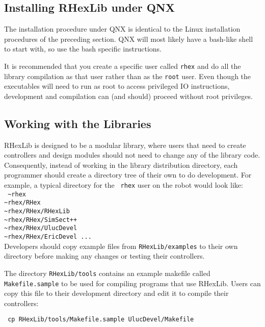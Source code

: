 \subsection{Installing RHexLib under QNX}

The installation procedure under QNX is identical to the Linux installation
procedures of the preceding section. QNX will most likely have a bash-like
shell to start with, so use the bash specific instructions.

It is recommended that you create a specific user called {\tt rhex} and do
all the library compilation as that user rather than as the {\tt root}
user. Even though the executables will need to run as root to access
privileged IO instructions, development and compilation can (and should)
proceed without root privileges.

\subsection{Working with the Libraries} \label{sec:worklibraries}

RHexLib is designed to be a modular library, where users that need to create
controllers and design modules should not need to change any of the library
code. Consequently, instead of working in the library
distribution directory, each programmer should create a directory tree of
their own to do development. For example, a typical directory for the {\tt
  rhex} user on the robot would look like:\\

{\tt 
\noindent\~{}rhex \\
\~{}rhex/RHex \\
\~{}rhex/RHex/RHexLib \\
\~{}rhex/RHex/SimSect++ \\
\~{}rhex/RHex/UlucDevel \\
\~{}rhex/RHex/EricDevel
...
}\\

Developers should copy example files from {\tt RHexLib/examples} to their
own directory before making any changes or testing their controllers.

The directory {\tt RHexLib/tools} contains an example makefile called {\tt
Makefile.sample} to be used for compiling programs that use RHexLib. Users
can copy this file to their development directory and edit it to compile
their controllers:

{\tt 
\noindent cp RHexLib/tools/Makefile.sample UlucDevel/Makefile \\
}

